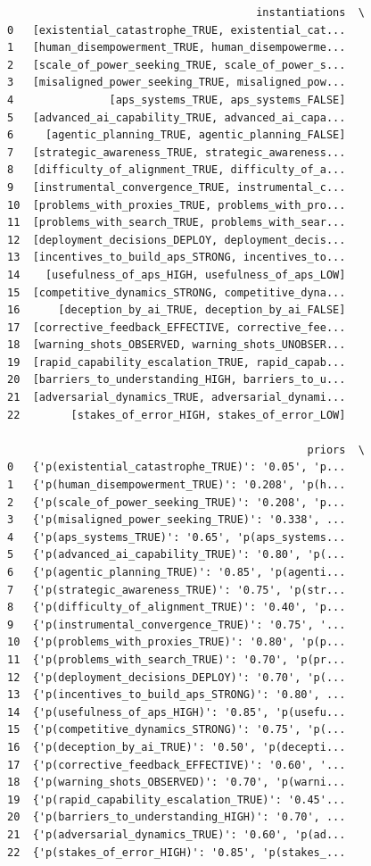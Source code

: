 \documentclass[
  11pt,
  letterpaper,
]{book}
\begin{document}
\begin{verbatim}
                                       instantiations  \
0   [existential_catastrophe_TRUE, existential_cat...   
1   [human_disempowerment_TRUE, human_disempowerme...   
2   [scale_of_power_seeking_TRUE, scale_of_power_s...   
3   [misaligned_power_seeking_TRUE, misaligned_pow...   
4               [aps_systems_TRUE, aps_systems_FALSE]   
5   [advanced_ai_capability_TRUE, advanced_ai_capa...   
6     [agentic_planning_TRUE, agentic_planning_FALSE]   
7   [strategic_awareness_TRUE, strategic_awareness...   
8   [difficulty_of_alignment_TRUE, difficulty_of_a...   
9   [instrumental_convergence_TRUE, instrumental_c...   
10  [problems_with_proxies_TRUE, problems_with_pro...   
11  [problems_with_search_TRUE, problems_with_sear...   
12  [deployment_decisions_DEPLOY, deployment_decis...   
13  [incentives_to_build_aps_STRONG, incentives_to...   
14    [usefulness_of_aps_HIGH, usefulness_of_aps_LOW]   
15  [competitive_dynamics_STRONG, competitive_dyna...   
16      [deception_by_ai_TRUE, deception_by_ai_FALSE]   
17  [corrective_feedback_EFFECTIVE, corrective_fee...   
18  [warning_shots_OBSERVED, warning_shots_UNOBSER...   
19  [rapid_capability_escalation_TRUE, rapid_capab...   
20  [barriers_to_understanding_HIGH, barriers_to_u...   
21  [adversarial_dynamics_TRUE, adversarial_dynami...   
22        [stakes_of_error_HIGH, stakes_of_error_LOW]   

                                               priors  \
0   {'p(existential_catastrophe_TRUE)': '0.05', 'p...   
1   {'p(human_disempowerment_TRUE)': '0.208', 'p(h...   
2   {'p(scale_of_power_seeking_TRUE)': '0.208', 'p...   
3   {'p(misaligned_power_seeking_TRUE)': '0.338', ...   
4   {'p(aps_systems_TRUE)': '0.65', 'p(aps_systems...   
5   {'p(advanced_ai_capability_TRUE)': '0.80', 'p(...   
6   {'p(agentic_planning_TRUE)': '0.85', 'p(agenti...   
7   {'p(strategic_awareness_TRUE)': '0.75', 'p(str...   
8   {'p(difficulty_of_alignment_TRUE)': '0.40', 'p...   
9   {'p(instrumental_convergence_TRUE)': '0.75', '...   
10  {'p(problems_with_proxies_TRUE)': '0.80', 'p(p...   
11  {'p(problems_with_search_TRUE)': '0.70', 'p(pr...   
12  {'p(deployment_decisions_DEPLOY)': '0.70', 'p(...   
13  {'p(incentives_to_build_aps_STRONG)': '0.80', ...   
14  {'p(usefulness_of_aps_HIGH)': '0.85', 'p(usefu...   
15  {'p(competitive_dynamics_STRONG)': '0.75', 'p(...   
16  {'p(deception_by_ai_TRUE)': '0.50', 'p(decepti...   
17  {'p(corrective_feedback_EFFECTIVE)': '0.60', '...   
18  {'p(warning_shots_OBSERVED)': '0.70', 'p(warni...   
19  {'p(rapid_capability_escalation_TRUE)': '0.45'...   
20  {'p(barriers_to_understanding_HIGH)': '0.70', ...   
21  {'p(adversarial_dynamics_TRUE)': '0.60', 'p(ad...   
22  {'p(stakes_of_error_HIGH)': '0.85', 'p(stakes_...   


\end{verbatim}
\end{document}
